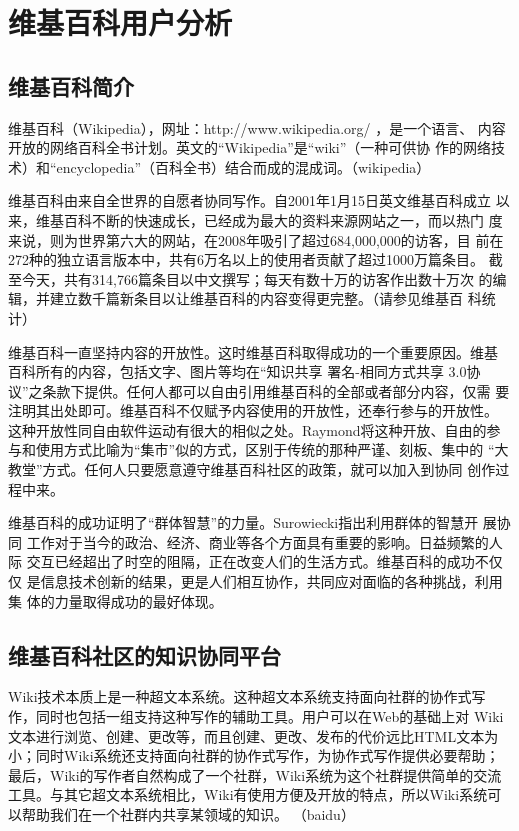 \chapter{维基百科用户分析}
\label{cha:wikipedian}

\section{维基百科简介}
维基百科（Wikipedia），网址：http://www.wikipedia.org/  ，是一个语言、
内容开放的网络百科全书计划。英文的“Wikipedia”是“wiki”（一种可供协
作的网络技术）和“encyclopedia”（百科全书）结合而成的混成词。（wikipedia）

维基百科由来自全世界的自愿者协同写作。自2001年1月15日英文维基百科成立
以来，维基百科不断的快速成长，已经成为最大的资料来源网站之一，而以热门
度来说，则为世界第六大的网站，在2008年吸引了超过684,000,000的访客，目
前在272种的独立语言版本中，共有6万名以上的使用者贡献了超过1000万篇条目。
截至今天，共有314,766篇条目以中文撰写；每天有数十万的访客作出数十万次
的编辑，并建立数千篇新条目以让维基百科的内容变得更完整。（请参见维基百
科统计）

维基百科一直坚持内容的开放性。这时维基百科取得成功的一个重要原因。维基
百科所有的内容，包括文字、图片等均在“知识共享 署名-相同方式共享 3.0协
议”之条款下提供。任何人都可以自由引用维基百科的全部或者部分内容，仅需
要注明其出处即可。维基百科不仅赋予内容使用的开放性，还奉行参与的开放性。
这种开放性同自由软件运动有很大的相似之处。Raymond将这种开放、自由的参
与和使用方式比喻为“集市”似的方式，区别于传统的那种严谨、刻板、集中的
“大教堂”方式。任何人只要愿意遵守维基百科社区的政策，就可以加入到协同
创作过程中来。

维基百科的成功证明了“群体智慧”的力量。Surowiecki指出利用群体的智慧开
展协同
工作对于当今的政治、经济、商业等各个方面具有重要的影响。日益频繁的人际
交互已经超出了时空的阻隔，正在改变人们的生活方式。维基百科的成功不仅仅
是信息技术创新的结果，更是人们相互协作，共同应对面临的各种挑战，利用集
体的力量取得成功的最好体现。

\section{维基百科社区的知识协同平台}

Wiki技术本质上是一种超文本系统。这种超文本系统支持面向社群的协作式写
作，同时也包括一组支持这种写作的辅助工具。用户可以在Web的基础上对 Wiki
文本进行浏览、创建、更改等，而且创建、更改、发布的代价远比HTML文本为
小；同时Wiki系统还支持面向社群的协作式写作，为协作式写作提供必要帮助；
最后，Wiki的写作者自然构成了一个社群，Wiki系统为这个社群提供简单的交流
工具。与其它超文本系统相比，Wiki有使用方便及开放的特点，所以Wiki系统可
以帮助我们在一个社群内共享某领域的知识。 （baidu）

